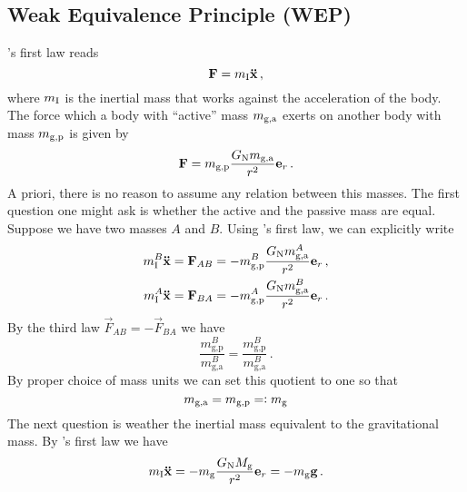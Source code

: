 \subsection*{Weak Equivalence Principle (WEP)}
's first law reads
\begin{equation}
    \vec{F}=m\textsubscript{I} \vec{\ddot{x}} \, ,
\end{equation}
where $m\textsubscript{I}$ is the inertial mass that works against the acceleration of the body.
The force which a body with ``active'' mass $m\textsubscript{g,a}$ exerts on
another body with mass $m\textsubscript{g,p}$ is given by 
\begin{equation}
    \vec{F}=m\textsubscript{g,p}\frac{G\textsubscript{N}m\textsubscript{g,a}}{r^2}\vec{e}_r \, .
\end{equation}
A priori, there is no reason to assume any relation between this masses.
The first question one might ask is whether the active and the passive mass are equal.
Suppose we have two masses $A$ and $B$. Using 's first law, we
can explicitly write
\begin{align}
    m^{B}_{\text{I}}\vec{\ddot{x}}&=\vec{F}_{AB}=-
    m^{B}_{\text{g,p}}\frac{G\textsubscript{N}m^{A}_{\text{g,a}}}{r^2}\vec{e}_r
    \, ,\\
    m^{A}_{\text{I}}\vec{\ddot{x}}&=\vec{F}_{BA}=-
    m^{A}_{\text{g,p}}\frac{G\textsubscript{N}m^{B}_{\text{g,a}}}{r^2}\vec{e}_r
    \, .
\end{align}
By the third law $\vec{F}_{AB}=-\vec{F}_{BA}$ we have
\begin{equation}
\frac{m^{B}_{\text{g,p}}}{m^{B}_{\text{g,a}}}=\frac{m^{B}_{\text{g,p}}}{m^{B}_{\text{g,a}}}\,.
\end{equation}
By proper choice of mass units we can set this quotient to one so that 
\begin{equation}
m\textsubscript{g,a}=m\textsubscript{g,p}=:m\textsubscript{g}
\end{equation}
The next question is weather the inertial mass equivalent to the gravitational
mass.
By 's first law we have
\begin{equation}
m\textsubscript{I}\vec{\ddot{x}}
=-m_{\text{g}}\frac{G\textsubscript{N}M_{\text{g}}}{r^2}\vec{e}_r 
=-m_{\text{g}}\vec{g}\,.
\end{equation}
